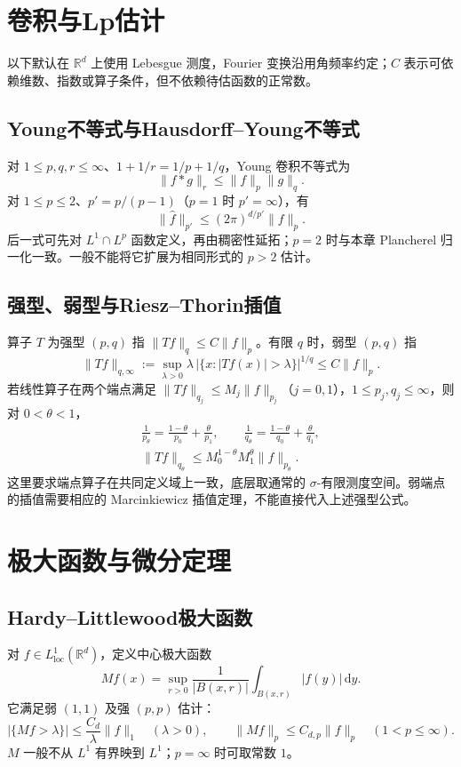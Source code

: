 \documentclass[../main.tex]{subfiles}
\begin{document}
\section{卷积与Lp估计}
以下默认在 $\mathbb R^d$ 上使用 Lebesgue 测度，Fourier 变换沿用角频率约定；$C$ 表示可依赖维数、指数或算子条件，但不依赖待估函数的正常数。
\subsection{Young不等式与Hausdorff--Young不等式}
对 $1\le p,q,r\le\infty$、$1+1/r=1/p+1/q$，Young 卷积不等式为
\[
\|f*g\|_r\le\|f\|_p\|g\|_q.
\]
对 $1\le p\le2$、$p'=p/(p-1)$（$p=1$ 时 $p'=\infty$），有
\[
\|\widehat f\|_{p'}\le(2\pi)^{d/p'}\|f\|_p.
\]
后一式可先对 $L^1\cap L^p$ 函数定义，再由稠密性延拓；$p=2$ 时与本章 Plancherel 归一化一致。一般不能将它扩展为相同形式的 $p>2$ 估计。
\subsection{强型、弱型与Riesz--Thorin插值}
算子 $T$ 为强型 $(p,q)$ 指 $\|Tf\|_q\le C\|f\|_p$。有限 $q$ 时，弱型 $(p,q)$ 指
\[
\|Tf\|_{q,\infty}:=\sup_{\lambda>0}\lambda\,|\{x:|Tf(x)|>\lambda\}|^{1/q}
\le C\|f\|_p.
\]
若线性算子在两个端点满足 $\|Tf\|_{q_j}\le M_j\|f\|_{p_j}$（$j=0,1$），$1\le p_j,q_j\le\infty$，则对 $0<\theta<1$，
\begin{gather*}
\frac1{p_\theta}=\frac{1-\theta}{p_0}+\frac\theta{p_1},\qquad
\frac1{q_\theta}=\frac{1-\theta}{q_0}+\frac\theta{q_1},\\
\|Tf\|_{q_\theta}\le M_0^{1-\theta}M_1^\theta\|f\|_{p_\theta}.
\end{gather*}
这里要求端点算子在共同定义域上一致，底层取通常的 $\sigma$-有限测度空间。弱端点的插值需要相应的 Marcinkiewicz 插值定理，不能直接代入上述强型公式。
\section{极大函数与微分定理}
\subsection{Hardy--Littlewood极大函数}
对 $f\in L^1_{\mathrm{loc}}(\mathbb R^d)$，定义中心极大函数
\[
Mf(x)=\sup_{r>0}\frac1{|B(x,r)|}\int_{B(x,r)}|f(y)|\,\mathrm dy.
\]
它满足弱 $(1,1)$ 及强 $(p,p)$ 估计：
\[
|\{Mf>\lambda\}|\le\frac{C_d}{\lambda}\|f\|_1\quad(\lambda>0),\qquad
\|Mf\|_p\le C_{d,p}\|f\|_p\quad(1<p\le\infty).
\]
$M$ 一般不从 $L^1$ 有界映到 $L^1$；$p=\infty$ 时可取常数 $1$。
\end{document}
